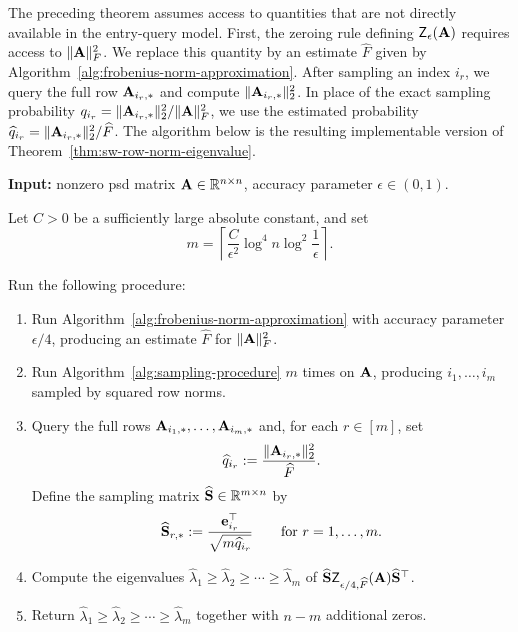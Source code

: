 The preceding theorem assumes access to quantities that are not directly
available in the entry-query model. First, the zeroing rule defining \(\mathsf Z_{\epsilon}(\mathbf{A})\) requires access to
\(\|\mathbf{A}\|_F^2\). We replace this quantity by an estimate \(\widehat F\) given by Algorithm~\ref{alg:frobenius-norm-approximation}. After sampling an index \(i_r\), we query the full row
\(\mathbf{A}_{i_r,*}\) and compute
\(\|\mathbf{A}_{i_r,*}\|_2^2\). In place of the exact sampling probability
\(q_{i_r}=\|\mathbf{A}_{i_r,*}\|_2^2/\|\mathbf{A}\|_F^2\), we use the estimated probability
\(\widehat q_{i_r}=\|\mathbf{A}_{i_r,*}\|_2^2/\widehat F\). The algorithm
below is the resulting implementable version of Theorem~\ref{thm:sw-row-norm-eigenvalue}.

\begin{algorithm}[H]
\caption{Sublinear PSD Eigenvalue Approximation}
\label{alg:sublinear-psd-eigenvalue}

\noindent
\textbf{Input:} nonzero psd matrix \(\mathbf{A}\in\mathbb{R}^{n\times n}\), accuracy
parameter \(\epsilon\in(0,1)\).

\smallskip
Let \(C>0\) be a sufficiently large absolute constant, and set
\[
    m =
    \left\lceil
    \frac{C}{\epsilon^2}
    \log^4 n
    \log^2\frac{1}{\epsilon}
    \right\rceil .
\]

\smallskip
Run the following procedure:

\begin{enumerate}[
    label=\arabic*.,
    leftmargin=2em,
    itemsep=0.35em,
    topsep=0.45em,
    parsep=0pt
]
    \item Run Algorithm~\ref{alg:frobenius-norm-approximation} with
    accuracy parameter \(\epsilon/4\), producing an estimate
    \(\widehat F\) for \(\|\mathbf{A}\|_F^2\).

    \item Run Algorithm~\ref{alg:sampling-procedure}
    \(m\) times on \(\mathbf{A}\), producing $i_1,\ldots,i_m$ sampled by squared row norms.

    \item Query the full rows
    \(
        \mathbf{A}_{i_1,*},\ldots,\mathbf{A}_{i_m,*}
    \)
    and, for each \(r\in[m]\), set
    \[
        \widehat q_{i_r}
        :=
        \frac{\|\mathbf{A}_{i_r,*}\|_2^2}{\widehat F}.
    \]
    Define the sampling matrix \(\widehat {\mathbf{S}}\in\mathbb{R}^{m\times n}\) by
    \[
        \widehat {\mathbf{S}}_{r,*}
        :=
        \frac{\mathbf{e}_{i_r}^{\top}}{\sqrt{m\widehat q_{i_r}}}
        \qquad\text{for } r=1,\ldots,m.
    \]
    \item Compute the eigenvalues
    \(
        \widehat\lambda_1\geq \widehat\lambda_2\geq\cdots\geq \widehat\lambda_m
    \)
    of \(\widehat {\mathbf{S}}\mathsf Z_{\epsilon/4,\widehat F}(\mathbf{A})\widehat {\mathbf{S}}^\top\).

    \item Return
    \(
        \widehat\lambda_1\geq \widehat\lambda_2\geq\cdots\geq \widehat\lambda_m
    \)
    together with \(n-m\) additional zeros.
\end{enumerate}
\end{algorithm}



